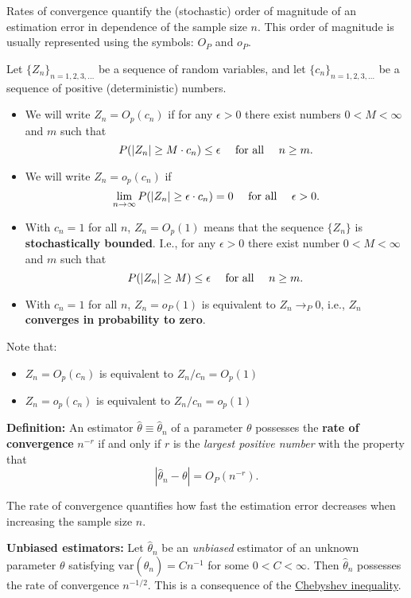\documentclass[
]{book}
\providecommand{\tightlist}{%
  \setlength{\itemsep}{0pt}\setlength{\parskip}{0pt}}
\begin{document}
Rates of convergence quantify the (stochastic) order of magnitude of an estimation error in dependence of the
sample size \(n\). This order of magnitude is usually represented using the symbols: \(O_P\) and \(o_P\).

\hfill\break

Let \(\{Z_n\}_{n=1,2,3,\dots}\) be a sequence of random variables, and let \(\{c_n\}_{n=1,2,3,\dots}\) be a sequence of positive (deterministic) numbers.

\begin{itemize}
\tightlist
\item
  We will write \(Z_n=O_p(c_n)\) if for any \(\epsilon>0\) there exist numbers \(0<M<\infty\) and \(m\) such that
  \[P(|Z_n|\ge M\cdot c_n)\leq\epsilon\quad\hbox{ for all }\quad n\geq m.\]
\item
  We will write \(Z_n=o_p(c_n)\) if
  \[\lim_{n\to\infty} P(|Z_n|\geq\epsilon\cdot c_n)=0\quad\hbox{ for all }\quad \epsilon>0.\]
\item
  With \(c_n=1\) for all \(n\), \(Z_n=O_p(1)\) means that the sequence \(\{Z_n\}\) is \textbf{stochastically bounded}. I.e., for any \(\epsilon>0\) there exist number \(0<M<\infty\) and \(m\) such that
  \[P(|Z_n|\geq M)\leq\epsilon\quad\hbox{ for all }\quad n\geq m.\]
\item
  With \(c_n=1\) for all \(n\), \(Z_n=o_P(1)\) is equivalent to \(Z_n\to_{P} 0\), i.e., \(Z_n\) \textbf{converges in probability to zero}.
\end{itemize}

Note that:

\begin{itemize}
\tightlist
\item
  \(Z_n=O_p(c_n)\) is equivalent to \(Z_n/c_n=O_p(1)\)
\item
  \(Z_n=o_p(c_n)\) is equivalent to \(Z_n/c_n=o_p(1)\)
\end{itemize}

\hfill\break

\textbf{Definition:} An estimator \(\hat\theta\equiv\hat\theta_n\) of a parameter \(\theta\) possesses the
\textbf{rate of convergence} \(n^{-r}\) if and only if \(r\) is the \emph{largest positive number} with the property that
\[|\hat\theta_n-\theta|=O_P(n^{-r}).\]

The rate of convergence quantifies how fast the estimation error decreases when increasing the sample size \(n\).

\hfill\break

\textbf{Unbiased estimators:} Let \(\hat\theta_n\) be an \emph{unbiased} estimator of an unknown parameter \(\theta\) satisfying \(\textrm{var}(\hat\theta_n)=C n^{-1}\) for some \(0<C<\infty\). Then \(\hat\theta_n\) possesses the rate of convergence \(n^{-1/2}\). This is a consequence of the \href{https://www.statlect.com/fundamentals-of-probability/Chebyshev-inequality}{Chebyshev inequality}.
\end{document}
